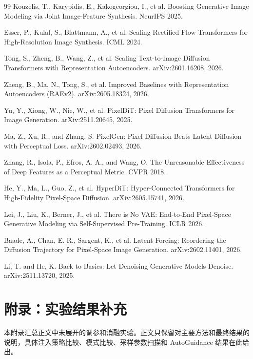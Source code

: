 \documentclass[11pt]{article}
\begin{document}
\begin{thebibliography}{99}
Kouzelis, T., Karypidis, E., Kakogeorgiou, I., et al. Boosting Generative Image Modeling via Joint Image-Feature Synthesis. NeurIPS 2025.

Esser, P., Kulal, S., Blattmann, A., et al. Scaling Rectified Flow Transformers for High-Resolution Image Synthesis. ICML 2024.

Tong, S., Zheng, B., Wang, Z., et al. Scaling Text-to-Image Diffusion Transformers with Representation Autoencoders. arXiv:2601.16208, 2026.

Zheng, B., Ma, N., Tong, S., et al. Improved Baselines with Representation Autoencoders (RAEv2). arXiv:2605.18324, 2026.

Yu, Y., Xiong, W., Nie, W., et al. PixelDiT: Pixel Diffusion Transformers for Image Generation. arXiv:2511.20645, 2025.

Ma, Z., Xu, R., and Zhang, S. PixelGen: Pixel Diffusion Beats Latent Diffusion with Perceptual Loss. arXiv:2602.02493, 2026.

Zhang, R., Isola, P., Efros, A. A., and Wang, O. The Unreasonable Effectiveness of Deep Features as a Perceptual Metric. CVPR 2018.

He, Y., Ma, L., Guo, Z., et al. HyperDiT: Hyper-Connected Transformers for High-Fidelity Pixel-Space Diffusion. arXiv:2605.15741, 2026.

Lei, J., Liu, K., Berner, J., et al. There is No VAE: End-to-End Pixel-Space Generative Modeling via Self-Supervised Pre-Training. ICLR 2026.

Baade, A., Chan, E. R., Sargent, K., et al. Latent Forcing: Reordering the Diffusion Trajectory for Pixel-Space Image Generation. arXiv:2602.11401, 2026.

Li, T. and He, K. Back to Basics: Let Denoising Generative Models Denoise. arXiv:2511.13720, 2025.

\end{thebibliography}

\appendix

\section{附录：实验结果补充}

本附录汇总正文中未展开的调参和消融实验。正文只保留对主要方法和最终结果的说明，具体注入策略比较、模式比较、采样参数扫描和 AutoGuidance 结果在此给出。
\end{document}
